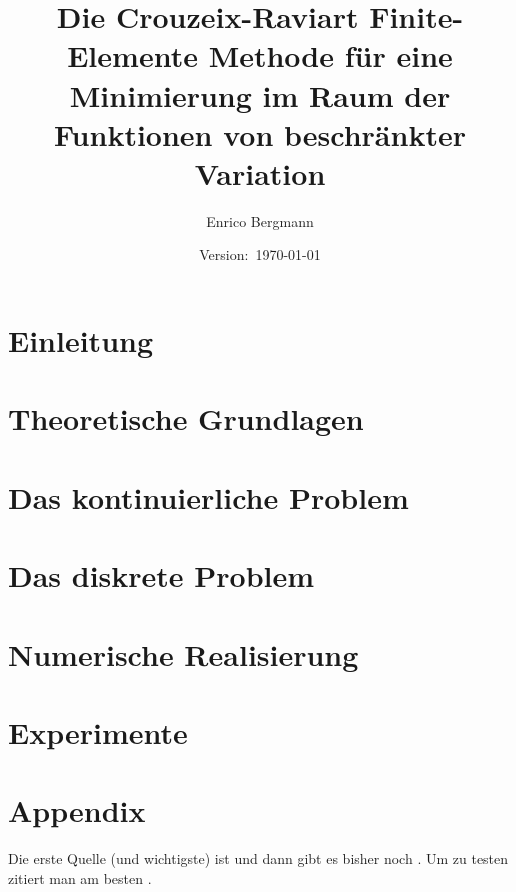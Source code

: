 \documentclass[draft=false,twoside,12pt]{scrreprt}
\title{Die Crouzeix-Raviart Finite-Elemente Methode für eine Minimierung im Raum
der Funktionen von beschränkter Variation}
\author{Enrico Bergmann}
\date{Version:~\today}
\begin{document}
\maketitle
\tableofcontents

\todototoc
\listoftodos

\chapter{Einleitung}


\chapter{Theoretische Grundlagen}


\chapter{Das kontinuierliche Problem}


\chapter{Das diskrete Problem}


\chapter{Numerische Realisierung}
%

\chapter{Experimente}



\appendix
\chapter{Appendix}


Die erste Quelle (und wichtigste) ist \cite{Bar15} und dann gibt es bisher 
noch
\cite[200]{Roc70}.
Um zu testen zitiert man am besten \cite{Mus99}.
\end{document}

